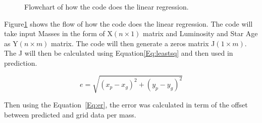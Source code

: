 \begin{figure}[H]
    \centering

    \caption{Flowchart of how the code does the linear regression.}
    \label{fig:flow}
\end{figure}

Figure\ref{fig:flow} shows the flow of how the code does the linear regression. The code will take input Masses in the form of X$(n\times1)$ matrix and Luminosity and Star Age as Y$(n\times m)$ matrix. The code will then generate a zeros matrix J$(1\times m)$. The J will then be calculated using Equation\ref{Eq:leastsq} and then used in prediction.

\begin{equation}
    e=\sqrt{(x_p-x_g)^2+(y_p-y_g)^2}
    \label{Eq:er}
\end{equation}

Then using the Equation~\ref{Eq:er}, the error was calculated in term of the offset between predicted and grid data per mass.